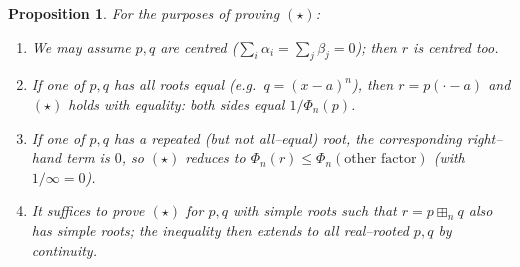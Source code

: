 \documentclass[12pt]{article}
\newtheorem{proposition}{Proposition}
\theoremstyle{definition}
\newcommand{\boxp}{\boxplus_n}
\begin{document}
\begin{proposition}\label{prop:reductions}
For the purposes of proving $(\star)$:
\begin{enumerate}
\item[\textup{(0)}] We may assume $p,q$ are centred ($\sum_i\alpha_i=\sum_j\beta_j=0$); then
$r$ is centred too.
\item[\textup{(b)}] If one of $p,q$ has all roots equal (e.g.\ $q=(x-a)^n$), then
$r=p(\cdot-a)$ and $(\star)$ holds with equality: both sides equal $1/\Phi_n(p)$.
\item[\textup{(a)}] If one of $p,q$ has a repeated (but not all--equal) root, the
corresponding right--hand term is $0$, so $(\star)$ reduces to
$\Phi_n(r)\le\Phi_n(\text{other factor})$ \textup{(}with $1/\infty=0$\textup{)}.
\item[\textup{(c)}] It suffices to prove $(\star)$ for $p,q$ with simple roots such that
$r=p\boxp q$ also has simple roots; the inequality then extends to all real--rooted $p,q$ by
continuity.
\end{enumerate}
\end{proposition}
\end{document}
